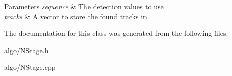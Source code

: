 \begin{DoxyParams}{Parameters}
{\em sequence} & The detection values to use \\
\hline
{\em tracks} & A vector to store the found tracks in \\
\hline
\end{DoxyParams}


The documentation for this class was generated from the following files\+:\begin{DoxyCompactItemize}
\item 
algo/N\+Stage.\+h\item 
algo/N\+Stage.\+cpp\end{DoxyCompactItemize}
